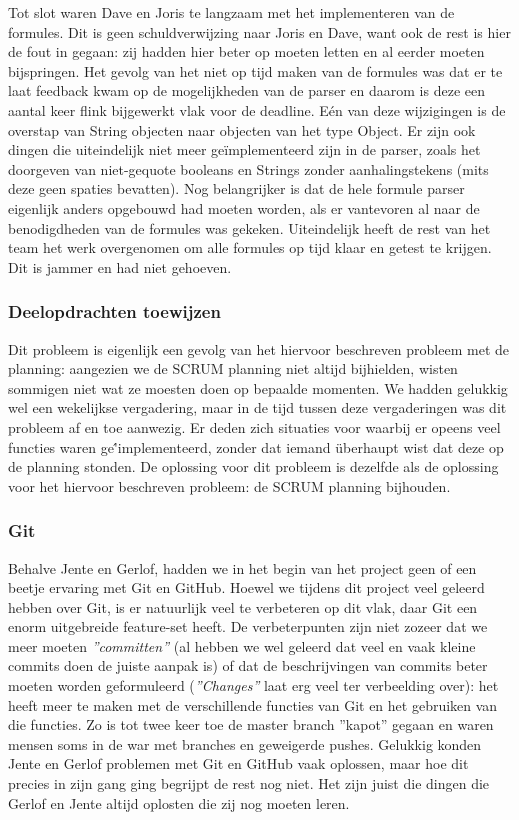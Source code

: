 \documentclass[a4paper,11pt,titlepage]{scrartcl}
\begin{document}
Tot slot waren Dave en Joris te langzaam met het implementeren van de formules. Dit is geen schuldverwijzing naar Joris en Dave, want ook de rest is hier de fout in gegaan: zij hadden hier beter op moeten letten en al eerder moeten bijspringen. Het gevolg van het niet op tijd maken van de formules was dat er te laat feedback kwam op de mogelijkheden van de parser en daarom is deze een aantal keer flink bijgewerkt vlak voor de deadline. Eén van deze wijzigingen is de overstap van String objecten naar objecten van het type Object. Er zijn ook dingen die uiteindelijk niet meer geïmplementeerd zijn in de parser, zoals het doorgeven van niet-gequote booleans en Strings zonder aanhalingstekens (mits deze geen spaties bevatten). Nog belangrijker is dat de hele formule parser eigenlijk anders opgebouwd had moeten worden, als er vantevoren al naar de benodigdheden van de formules was gekeken. Uiteindelijk heeft de rest van het team het werk overgenomen om alle formules op tijd klaar en getest te krijgen. Dit is jammer en had niet gehoeven.

\subsubsection{Deelopdrachten toewijzen}
Dit probleem is eigenlijk een gevolg van het hiervoor beschreven probleem met de planning: aangezien we de SCRUM planning niet altijd bijhielden, wisten sommigen niet wat ze moesten doen op bepaalde momenten. We hadden gelukkig wel een wekelijkse vergadering, maar in de tijd tussen deze vergaderingen was dit probleem af en toe aanwezig. Er deden zich situaties voor waarbij er opeens veel functies waren ge\''{i}mplementeerd, zonder dat iemand überhaupt wist dat deze op de planning stonden. De oplossing voor dit probleem is dezelfde als de oplossing voor het hiervoor beschreven probleem: de SCRUM planning bijhouden.

\subsubsection{Git}
Behalve Jente en Gerlof, hadden we in het begin van het project geen of een beetje ervaring met Git en GitHub. Hoewel we tijdens dit project veel geleerd hebben over Git, is er natuurlijk veel te verbeteren op dit vlak, daar Git een enorm uitgebreide feature-set heeft. De verbeterpunten zijn niet zozeer dat we meer moeten \textit{''committen''} (al hebben we wel geleerd dat veel en vaak kleine commits doen de juiste aanpak is) of dat de beschrijvingen van commits beter moeten worden geformuleerd (\textit{''Changes''} laat erg veel ter verbeelding over): het heeft meer te maken met de verschillende functies van Git en het gebruiken van die functies. Zo is tot twee keer toe de master branch ''kapot'' gegaan en waren mensen soms in de war met branches en geweigerde pushes. Gelukkig konden Jente en Gerlof problemen met Git en GitHub vaak oplossen, maar hoe dit precies in zijn gang ging begrijpt de rest nog niet. Het zijn juist die dingen die Gerlof en Jente altijd oplosten die zij nog moeten leren.
\end{document}
